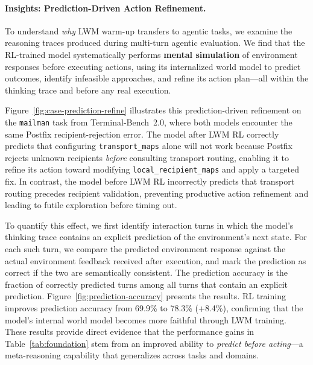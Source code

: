 \documentclass{llmxive}
\begin{document}
\paragraph{Insights: Prediction-Driven Action Refinement.}
To understand \emph{why} LWM warm-up transfers to agentic tasks, we examine the reasoning traces produced during multi-turn agentic evaluation.
We find that the RL-trained model systematically performs \textbf{mental simulation} of environment responses before executing actions, using its internalized world model to predict outcomes, identify infeasible approaches, and refine its action plan---all within the thinking trace and before any real execution.

Figure~\ref{fig:case-prediction-refine} illustrates this prediction-driven refinement on the \texttt{mailman} task from Terminal-Bench~2.0, where both models encounter the same Postfix recipient-rejection error.
The model after LWM RL correctly predicts that configuring \texttt{transport\_maps} alone will not work because Postfix rejects unknown recipients \emph{before} consulting transport routing, enabling it to refine its action toward modifying \texttt{local\_recipient\_maps} and apply a targeted fix.
In contrast, the model before LWM RL incorrectly predicts that transport routing precedes recipient validation, preventing productive action refinement and leading to futile exploration before timing out.

To quantify this effect, we first identify interaction turns in which the model's thinking trace contains an explicit prediction of the environment's next state.
For each such turn, we compare the predicted environment response against the actual environment feedback received after execution, and mark the prediction as correct if the two are semantically consistent.
The prediction accuracy is the fraction of correctly predicted turns among all turns that contain an explicit prediction.
Figure~\ref{fig:prediction-accuracy} presents the results.
RL training improves prediction accuracy from 69.9\% to 78.3\% (+8.4\%), confirming that the model's internal world model becomes more faithful through LWM training.
These results provide direct evidence that the performance gains in Table~\ref{tab:foundation} stem from an improved ability to \emph{predict before acting}---a meta-reasoning capability that generalizes across tasks and domains.
\end{document}
